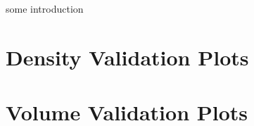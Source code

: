 some introduction 

\section{Density Validation Plots}
    



\section{Volume Validation Plots}
    

